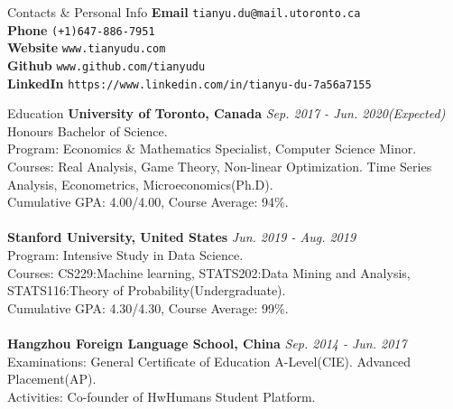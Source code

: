 \documentclass{resume} %
\begin{document}
\begin{rSection}{Contacts \& Personal Info}
	\textbf{Email} \texttt{tianyu.du@mail.utoronto.ca}
	\\
	\textbf{Phone} \texttt{(+1)647-886-7951}
	\\
	\textbf{Website} \texttt{www.tianyudu.com}
	\\
	\textbf{Github} \texttt{www.github.com/tianyudu}
	\\
	\textbf{LinkedIn} \texttt{https://www.linkedin.com/in/tianyu-du-7a56a7155}
\end{rSection}


\begin{rSection}{Education}
{\bf University of Toronto, Canada} \hfill {\em Sep. 2017 - Jun. 2020(Expected)} 
\\ Honours Bachelor of Science.
\\ Program: Economics \& Mathematics Specialist, Computer Science Minor.
\\ Courses: Real Analysis, Game Theory, Non-linear Optimization. Time Series Analysis, Econometrics, Microeconomics(Ph.D).
\\ Cumulative GPA: 4.00/4.00, Course Average: 94\%.
\\
\\{\bf Stanford University, United States} \hfill {\em Jun. 2019 - Aug. 2019} 
\\ Program: Intensive Study in Data Science.
\\ Courses: CS229:Machine learning, STATS202:Data Mining and Analysis, STATS116:Theory of Probability(Undergraduate).
\\ Cumulative GPA: 4.30/4.30, Course Average: 99\%.
\\
\\{\bf Hangzhou Foreign Language School, China} \hfill {\em Sep. 2014 - Jun. 2017} 
\\ Examinations: General Certificate of Education A-Level(CIE). Advanced Placement(AP).
\\ Activities: Co-founder of HwHumans Student Platform.


\end{rSection}
\end{document}
